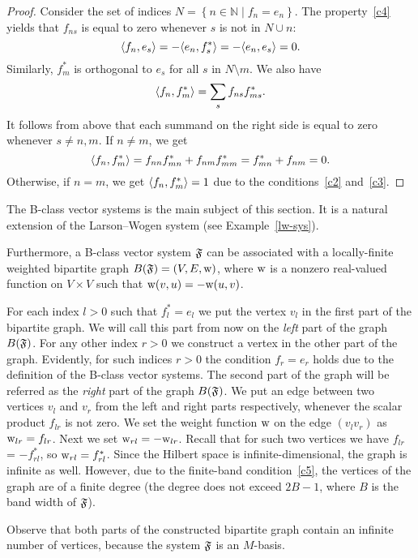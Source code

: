 \documentclass[12pt,oneside,a4paper]{amsart}
\begin{document}
    \begin{proof}
      Consider the set of indices $N = \left\{n \in \mathbb{N} \mid f_n = e_n \right\}$.
      The property~\ref{c4} yields that $f_{ns}$ is equal to zero whenever $s$ is not in $N \cup {n}$:
      \[
        \langle f_n, e_s \rangle = -\langle e_n, f^*_s \rangle = -\langle e_n, e_s \rangle = 0.
      \]
      Similarly, $f^*_m$ is orthogonal to $e_s$ for all $s$ in $N \setminus {m}$.
      We also have
      \[
        \langle f_n, f^*_m \rangle = \sum_{s} f_{ns} f_{ms}^*.
      \]
      It follows from above that each summand on the right side is equal to zero whenever $s \neq n, m$.
      If $n \neq m$, we get
      \[
        \langle f_n, f^*_m \rangle = f_{nn} f^*_{mn} + f_{nm} f^*_{mm}
        = f^*_{mn} + f_{nm} = 0.
      \]
      Otherwise, if $n = m$, we get $\langle f_n, f^*_m \rangle = 1$ due to the conditions~\ref{c2} and~\ref{c3}.
    \end{proof}
    The B-class vector systems is the main subject of this section.
    It is a natural extension of the Larson--Wogen system (see Example~\ref{lw-sys}).

    Furthermore, a B-class vector system $\mathfrak{F}$ can be associated with a
      locally-finite weighted bipartite graph $B(\mathfrak{F}) = (V, E, \mathrm{w})$, where $\mathrm{w}$ is a
      nonzero real-valued function on $V\times V$ such that $\mathrm{w}(v, u) = -\mathrm{w}(u, v)$.

    For each index $l > 0$ such that $f^*_l = e_l$ we put the vertex $v_l$ in the first part of the bipartite graph.
    We will call this part from now on the \emph{left} part of the graph $B(\mathfrak{F})$.
    For any other index $r > 0$ we construct a vertex in the other part of the graph.
    Evidently, for such indices $r > 0$ the condition $f_r = e_r$ holds due to the definition of the B-class vector systems.
    The second part of the graph will be referred as the \emph{right} part of the graph $B(\mathfrak{F})$.
    We put an edge between two vertices $v_l$ and $v_r$ from the left and right parts respectively,
      whenever the scalar product $f_{lr}$ is not zero.
    We set the weight function $\mathrm{w}$ on the edge $(v_l v_r)$ as $\mathrm{w}_{lr} = f_{lr}$.
    Next we set $\mathrm{w}_{rl} = -\mathrm{w}_{lr}$.
    Recall that for such two vertices we have $f_{lr}$ = $-f^*_{rl}$, so $\mathrm{w}_{rl} = f^*_{rl}$.
    Since the Hilbert space is infinite-dimensional, the graph is infinite as well.
    However, due to the finite-band condition~\ref{c5}, the vertices of the graph are of a finite degree (the degree does not
      exceed $2B - 1$, where $B$ is the band width of $\mathfrak{F}$).
    \begin{remark}
      Observe that both parts of the constructed bipartite graph contain an infinite number of vertices, because
        the system $\mathfrak{F}$ is an $M$-basis.
    \end{remark}
\end{document}
